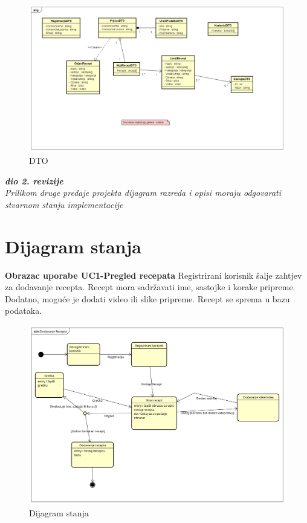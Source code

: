 \begin{figure}[H]
	\includegraphics[width=\textwidth]{slike/DTO.png} %
	\centering
	\caption{DTO}
	\label{fig:dijagramdto}
\end{figure}

\textbf{\textit{dio 2. revizije}}\\

\textit{Prilikom druge predaje projekta dijagram razreda i opisi moraju odgovarati stvarnom stanju implementacije}



\eject

\section{Dijagram stanja}


	\noindent
	\textbf{Obrazac uporabe UC1-Pregled recepata}\newline
		{Registrirani korisnik šalje zahtjev za dodavanje recepta. Recept mora sadržavati ime, sastojke i korake pripreme. Dodatno, moguće je dodati video ili slike pripreme. Recept se sprema u bazu podataka.}

	\begin{figure}[H]
		\includegraphics[scale= 0.4]{slike/DijagramStanja.png}
		\centering
		\caption{Dijagram stanja}
		\label{fig:Dijagram stanja}
	\end{figure} 
\eject

